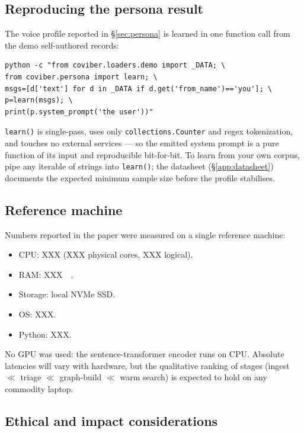 \subsection{Reproducing the persona result}
\label{app:persona}

The voice profile reported in \S\ref{sec:persona} is learned in one function
call from the demo self-authored records:

\begin{verbatim}
python -c "from coviber.loaders.demo import _DATA; \
from coviber.persona import learn; \
msgs=[d['text'] for d in _DATA if d.get('from_name')=='you']; \
p=learn(msgs); \
print(p.system_prompt('the user'))"
\end{verbatim}

\texttt{learn()} is single-pass, uses only \texttt{collections.Counter} and
regex tokenization, and touches no external services --- so the emitted
system prompt is a pure function of its input and reproducible bit-for-bit.
To learn from your own corpus, pipe any iterable of strings into
\texttt{learn()}; the datasheet (\S\ref{app:datasheet}) documents the
expected minimum sample size before the profile stabilises.

\subsection{Reference machine}
\label{app:hardware}

Numbers reported in the paper were measured on a single reference machine:
\begin{itemize}
  \item CPU: \SI{XXX}{} (\SI{XXX}{} physical cores, \SI{XXX}{} logical).
  \item RAM: \SI{XXX}{\giga\byte}.
  \item Storage: local NVMe SSD.
  \item OS: \SI{XXX}{}.
  \item Python: \SI{XXX}{}.
\end{itemize}

No GPU was used: the sentence-transformer encoder runs on CPU. Absolute
latencies will vary with hardware, but the qualitative ranking of stages
(ingest $\ll$ triage $\ll$ graph-build $\ll$ warm search) is expected to hold on
any commodity laptop.

\subsection{Ethical and impact considerations}
\label{app:ethics}

